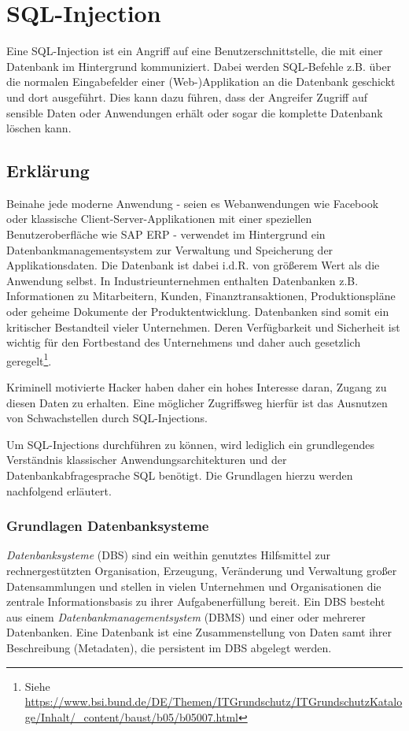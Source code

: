 \chapter{SQL-Injection}
Eine SQL-Injection ist ein Angriff auf eine Benutzerschnittstelle, die mit einer Datenbank im Hintergrund kommuniziert. Dabei werden SQL-Befehle z.B. über die normalen Eingabefelder einer (Web-)Applikation an die Datenbank geschickt und dort ausgeführt. Dies kann dazu führen, dass der Angreifer Zugriff auf sensible Daten oder Anwendungen erhält oder sogar die komplette Datenbank löschen kann. 

\section{Erklärung}
Beinahe jede moderne Anwendung - seien es Webanwendungen wie Facebook oder klassische Client-Server-Applikationen mit einer speziellen Benutzeroberfläche wie SAP ERP - verwendet im Hintergrund ein Datenbankmanagementsystem zur Verwaltung und Speicherung der Applikationsdaten. Die Datenbank ist dabei i.d.R. von größerem Wert als die Anwendung selbst. In Industrieunternehmen enthalten Datenbanken z.B. Informationen zu Mitarbeitern, Kunden, Finanztransaktionen, Produktionspläne oder geheime Dokumente der Produktentwicklung. Datenbanken sind somit ein kritischer Bestandteil vieler Unternehmen. Deren Verfügbarkeit und Sicherheit ist wichtig für den Fortbestand des Unternehmens und daher auch gesetzlich geregelt\footnote{Siehe \url{https://www.bsi.bund.de/DE/Themen/ITGrundschutz/ITGrundschutzKataloge/Inhalt/_content/baust/b05/b05007.html} }.

Kriminell motivierte Hacker haben daher ein hohes Interesse daran, Zugang zu diesen Daten zu erhalten. Eine möglicher Zugriffsweg hierfür ist das Ausnutzen von Schwachstellen durch SQL-Injections.

Um SQL-Injections durchführen zu können, wird lediglich ein grundlegendes Verständnis klassischer Anwendungsarchitekturen und der Datenbankabfragesprache SQL benötigt. Die Grundlagen hierzu werden nachfolgend erläutert.

\subsection{Grundlagen Datenbanksysteme}
\emph{Datenbanksysteme} (DBS) sind ein weithin genutztes Hilfsmittel zur rechnergestützten Organisation, Erzeugung, Veränderung und Verwaltung großer Datensammlungen und stellen in vielen Unternehmen und Organisationen die zentrale Informationsbasis zu ihrer Aufgabenerfüllung bereit. Ein DBS besteht aus einem \emph{Datenbankmanagementsystem} (DBMS) und einer oder mehrerer Datenbanken. Eine Datenbank ist eine Zusammenstellung von Daten samt ihrer Beschreibung (Metadaten), die persistent im DBS abgelegt werden.

